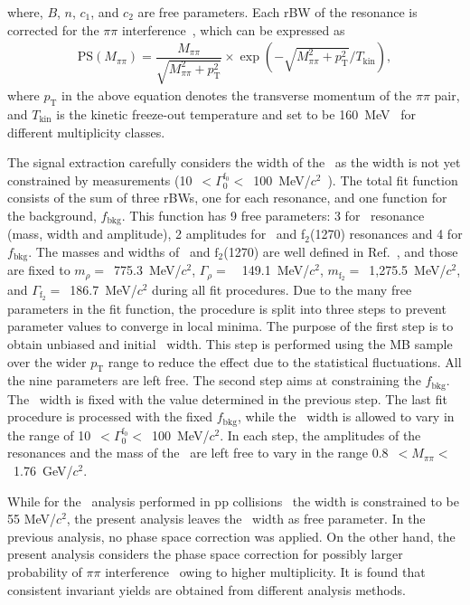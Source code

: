 where, $B$, $n$, $c_{1}$, and $c_{2}$ are free parameters. Each rBW of the resonance is corrected for the $\pi\pi$ interference~\cite{ALICE:2018qdv}, which can be expressed as
\begin{eqnarray}
\mathrm{PS}(M_{\pi\pi}) = \dfrac{M_{\pi\pi}}{\sqrt{M_{\pi\pi}^{2}+p_{\mathrm{T}}^{2}}}\times\exp{(-\sqrt{M_{\pi\pi}^{2}+p_{\mathrm{T}}^{2}}/T_{\mathrm{kin}})},
\label{eq:ps}
\end{eqnarray} 
where $p_{\mathrm{T}}$ in the above equation denotes the transverse momentum of the $\pi\pi$ pair, and $T_{\mathrm{kin}}$ is the kinetic freeze-out temperature and set to be 160~MeV~\cite{ALICE:2018qdv} for different multiplicity classes.

The signal extraction carefully considers the width of the \fzero~as the width is not yet constrained by measurements (10~$<\Gamma_{0}^{\mathrm{f}_{0}}<$~100~MeV/$c^{2}$~\cite{ParticleDataGroup:2022pth}). The total fit function consists of the sum of three rBWs, one for each resonance, and one function for the background, $f_{\mathrm{bkg}}$. This function has 9 free parameters: 3 for \fzero~resonance (mass, width and amplitude), 2 amplitudes for \rhoz~and f$_{2}$(1270) resonances and 4 for $f_{\mathrm{bkg}}$. The masses and widths of \rhoz~and $\mathrm{f}_{2}$(1270) are well defined in Ref.~\cite{ParticleDataGroup:2022pth}, and those are fixed to $m_{\rho}=$~775.3~MeV/$c^{2}$, $\Gamma_{\rho}=$~~149.1~MeV/$c^{2}$, $m_{\mathrm{f}_{2}}=$~1,275.5~MeV/$c^{2}$, and $\Gamma_{\mathrm{f}_{2}}=$~186.7~MeV/$c^{2}$ during all fit procedures. Due to the many free parameters in the fit function, the procedure is split into three steps to prevent parameter values to converge in local minima. The purpose of the first step is to obtain unbiased and initial \fzero~width. This step is performed using the MB sample over the wider $p_{\mathrm{T}}$ range to reduce the effect due to the statistical fluctuations. All the nine parameters are left free. The second step aims at constraining the $f_{\mathrm{bkg}}$. The \fzero~width is fixed with the value determined in the previous step. The last fit procedure is processed with the fixed $f_{\mathrm{bkg}}$, while the \fzero~width is allowed to vary in the range of 10~$<\Gamma_{0}^{\mathrm{f}_{0}}<$~100~MeV/$c^{2}$. In each step, the amplitudes of the resonances and the mass of the \fzero~are left free to vary in the range  0.8~$<M_{\pi\pi}<$~1.76~GeV/$c^{2}$.

While for the \fzero~analysis performed in pp collisions~\cite{ALICE:2022qnb} the width is constrained to be 55 MeV/$c^{2}$, the present analysis leaves the \fzero~width as free parameter. In the previous analysis, no phase space correction was applied. On the other hand, the present analysis considers the phase space correction for possibly larger probability of $\pi\pi$ interference~\cite{STAR:2003vqj} owing to higher multiplicity. It is found that consistent invariant yields are obtained from different analysis methods.

